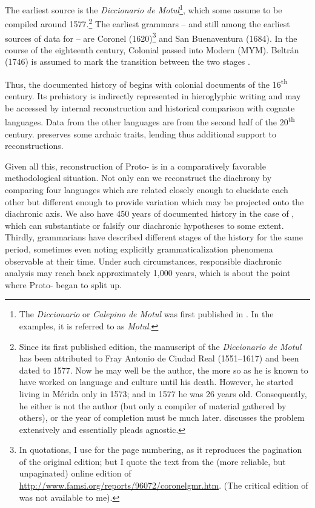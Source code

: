 \documentclass[output=paper]{langsci/langscibook}
\begin{document}
The earliest source is the \textit{Diccionario de Motul}\footnote{The \textit{Diccionario} or \textit{Calepino de Motul} was first published in \citet{MartínezHernández1929}. In the examples, it is referred to as \textit{Motul}.}, which some assume to be compiled around 1577.\footnote{Since its first published edition, the manuscript of the \textit{Diccionario de Motul} has been attributed to Fray Antonio de Ciudad Real (1551--1617) and been dated to 1577. Now he may well be the author, the more so as he is known to have worked on  language and culture until his death. However, he started living in Mérida only in 1573; and in 1577 he was 26 years old. Consequently, he either is not the author (but only a compiler of material gathered by others), or the year of completion must be much later. \citet[164--168]{Hanks2010} discusses the problem extensively and essentially pleads agnostic.} The earliest grammars – and still among the earliest sources of data for   – are Coronel (1620)\footnote{In quotations, I use \citet{MartínezHernández1929} for the page numbering, as it reproduces the pagination of the original edition; but I quote the text from the (more reliable, but unpaginated) online edition of \url{http://www.famsi.org/reports/96072/coronelgmr.htm}. (The critical edition of \citealt{Coronel1998} was not available to me).} and San Buenaventura (1684). In the course of the eighteenth century, Colonial   passed into Modern   (MYM). Beltrán (1746) is assumed to mark the transition between the two stages \citep[4]{Smailus1989}.
\nocite{Ciudad1929}



Thus, the documented history of   begins with colonial documents of the 16\textsuperscript{th} century. Its prehistory is indirectly represented in  hieroglyphic writing and may be accessed by internal reconstruction and historical comparison with cognate languages. Data from the other  languages are from the second half of the 20\textsuperscript{th} century.  preserves some archaic traits, lending thus additional support to reconstructions.


\largerpage
Given all this, reconstruction of Proto- is %
in a comparatively favorable methodological situation. Not only can we reconstruct the diachrony by comparing four languages which are related closely enough to elucidate each other but different enough to provide variation which may be projected onto the diachronic axis. We also have 450 years of documented history in the case of , which can substantiate or falsify our diachronic hypotheses to some extent. Thirdly, grammarians have described different stages of the history for the same period, sometimes even noting explicitly grammaticalization phenomena observable at their time. Under such circumstances, responsible diachronic analysis may reach back approximately 1,000 years, which is about the point where Proto- began to split up.
\end{document}
